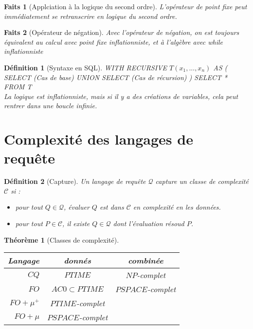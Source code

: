 \documentclass[landscape]{article}
\newcommand{\C}{\mathscr{C}}
\newcommand{\Q}{\mathscr{Q}}
\newcommand{\1}{\mathbbm{1}}
\newcommand{\0}{\mathbbm{0}}
\newtheorem{theo}{Théorème}
\newtheorem{defi}{Définition}
\newtheorem{fact}{Faits}
\begin{document}
\begin{multicols}{2}
    \begin{fact}[Applciation à la logique du second ordre]
      L'opérateur de point fixe peut immédiatement se retranscrire en logique du
      second ordre.
    \end{fact}

    \begin{fact}[Opérateur de négation]
      Avec l'opérateur de négation, on est toujours équivalent au calcul avec
      point fixe inflationniste, et à l'algèbre avec while inflationniste
    \end{fact}

    \begin{defi}[Syntaxe en SQL]
      WITH RECURSIVE $T(x_1,...,x_n)$ AS ( 
      SELECT (Cas de base)
      UNION
      SELECT (Cas de récursion)
      )
      SELECT * FROM T\\
      La logique est inflationniste, mais si il y a des créations de variables,
      cela peut rentrer dans une boucle infinie.
    \end{defi}

    \section{Complexité des langages de requête}

    \begin{defi}[Capture] Un langage de requête $\Q$ capture un classe de complexité
        $\C$ si :\begin{itemize}
            \item pour tout $Q\in\Q$, évaluer $Q$ est dans $\C$ en complexité
                en les données.
            \item pour tout $P\in\C$, il existe $Q\in\Q$ dont l'évaluation
                résoud $P$.
        \end{itemize}
    \end{defi}

    \begin{theo}[Classes de complexité]
        \begin{tabular}{r|cc}
            \hline Langage & donnés & combinée \\
            \hline
            $CQ$ & $PTIME$ & $NP$-complet \\
            $FO$ & $AC0\subset PTIME$ & $PSPACE$-complet \\
            $FO+\mu^+$ & $PTIME$-complet & \\
            $FO+\mu$ & $PSPACE$-complet & \\
            \hline
        \end{tabular}
    \end{theo}


\end{multicols}
\end{document}
